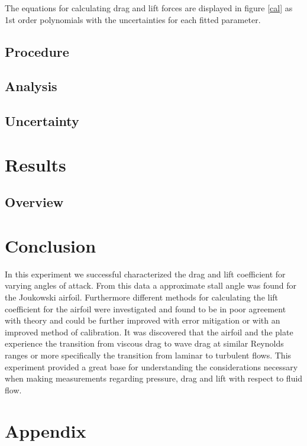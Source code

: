 \documentclass[paper=a4, fontsize=11pt, abstract=on]{scrartcl}
\numberwithin{equation}{section}		%
\numberwithin{figure}{section}			%
\numberwithin{table}{section}				%
\begin{document}
The equations for calculating drag and lift forces are displayed in figure \ref{cal} as 1st order polynomials with the uncertainties for each fitted parameter.

\subsection{Procedure}


\subsection{Analysis}

 
\subsection{Uncertainty} 

\newpage 
   
\section{Results}

\subsection{Overview}


\section{Conclusion}
In this experiment we successful characterized the drag and lift coefficient for varying angles of attack. From this data a approximate stall angle was found for the Joukowski airfoil. Furthermore different methods for calculating the lift coefficient for the airfoil were investigated and found to be in poor agreement with theory and could be further improved with error mitigation or with an improved method of calibration. It was discovered that the airfoil and the plate experience the transition from viscous drag to wave drag at similar Reynolds ranges or more specifically the transition from laminar to turbulent flows. This experiment provided a great base for understanding the considerations necessary when making measurements regarding pressure, drag and lift with respect to fluid flow.





\newpage



\appendix
\section{Appendix} \label{App:Appendix}
\end{document}
